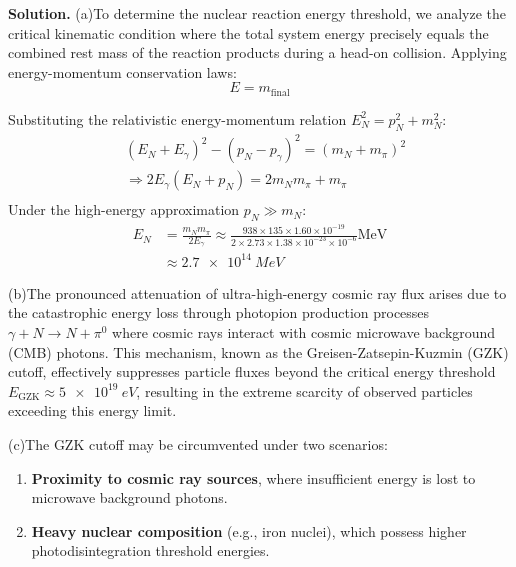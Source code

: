 \documentclass[12pt, a4paper, oneside]{article}
\newenvironment{solution}{\par\noindent\textbf{Solution. }}{\par}
\begin{document}
\begin{solution}
    (a)To determine the nuclear reaction energy threshold, we analyze the critical kinematic condition where the total system energy precisely equals the combined rest mass of the reaction products during a head-on collision. Applying energy-momentum conservation laws:
    \begin{equation*}
        E=m_\text{final}
    \end{equation*}

    Substituting the relativistic energy-momentum relation $E^2_N = p^2_N + m^2_N$:
    \begin{equation}
        \begin{split}
            &(E_N+E_\gamma)^2-(p_N-p_\gamma)^2=(m_N+m_\pi)^2\\
            &\Rightarrow 2E_\gamma(E_N+p_N)=2m_Nm_\pi+m_\pi\\
        \end{split}
    \end{equation}
    Under the high-energy approximation $p_N\gg m_N$:
    \begin{equation}
        \begin{split}
            E_N&=\frac{m_Nm_\pi}{2E_\gamma}\approx\frac{938\times135\times1.60\times10^{-19}}{2\times2.73\times 1.38\times10^{-23}\times10^{-6}}\text{MeV}\\
            &\approx\SI{2.7e14}{MeV}
        \end{split}
    \end{equation}

    (b)The pronounced attenuation of ultra-high-energy cosmic ray flux arises due to the catastrophic energy loss through photopion production processes $\gamma + N \to N + \pi^0$ where cosmic rays interact with cosmic microwave background (CMB) photons. This mechanism, known as the Greisen-Zatsepin-Kuzmin (GZK) cutoff, effectively suppresses particle fluxes beyond the critical energy threshold $E_\text{GZK} \approx \SI{5e19}{eV}$, resulting in the extreme scarcity of observed particles exceeding this energy limit. 
    
    (c)The GZK cutoff may be circumvented under two scenarios:
    \begin{enumerate}
        \item \textbf{Proximity to cosmic ray sources}, where insufficient energy is lost to microwave background photons.
        \item \textbf{Heavy nuclear composition} (e.g., iron nuclei), which possess higher photodisintegration threshold energies.
    \end{enumerate}
\end{solution}
\end{document}

